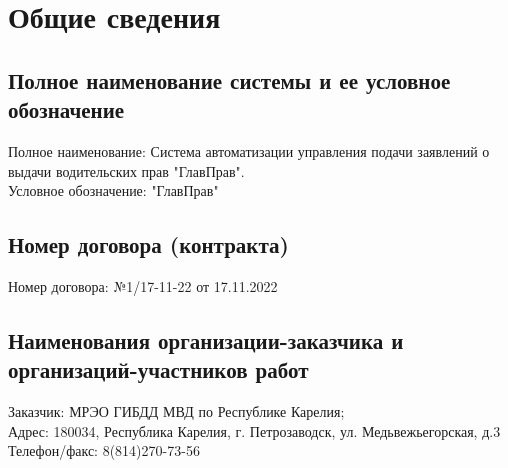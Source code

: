 \documentclass[russian, utf8, 12pt,pointsubsection,floatsubsection]{eskdtext}
\begin{document}
	\maketitle 

	\scriptsize
	\setcounter{tocdepth}{4}
	\tableofcontents
	\normalsize
	\newpage
	

\section{Общие сведения}



\subsection{Полное наименование системы и ее условное обозначение}
Полное наименование: Система автоматизации управления подачи заявлений о выдачи водительских прав "ГлавПрав".\\

Условное обозначение: "ГлавПрав"

\subsection{Номер договора (контракта)}
Номер договора: №1/17-11-22 от 17.11.2022

\subsection{Наименования организации-заказчика и организаций-участников работ}
Заказчик: МРЭО ГИБДД МВД по Республике Карелия; \\

Адрес: 180034, Республика Карелия, г. Петрозаводск, ул. Медьвежьегорская, д.3\\
Телефон/факс: 8(814)270-73-56 \\
\end{document}
